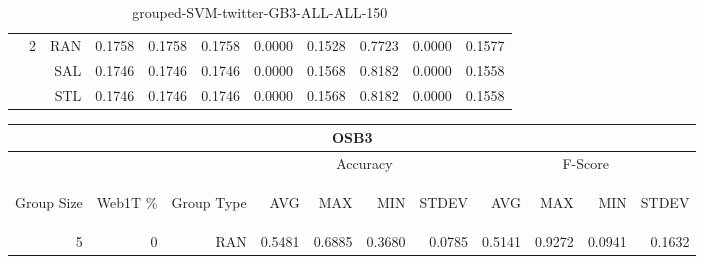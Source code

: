 \begin{center}
\begin{table}[htbp]
\begin{center}
\begin{tabular}{ | r | r | r | r | r | r | r | r | r | r | r |}
 & \multirow{3}{*}{2} & RAN & 0.1758 & 0.1758 & 0.1758 & 0.0000 & 0.1528 & 0.7723 & 0.0000 & 0.1577\\ \cline{3-11}
 &   & SAL & 0.1746 & 0.1746 & 0.1746 & 0.0000 & 0.1568 & 0.8182 & 0.0000 & 0.1558\\ \cline{3-11}
 &   & STL & 0.1746 & 0.1746 & 0.1746 & 0.0000 & 0.1568 & 0.8182 & 0.0000 & 0.1558\\ \cline{2-11}
\hline
\end{tabular}
\caption{grouped-SVM-twitter-GB3-ALL-ALL-150}
\end{center}
 \end{table}
\end{center}

\begin{center}
\begin{table}[htbp] 
 \begin{center}
\begin{tabular}{ | r | r | r | r | r | r | r | r | r | r | r |}
\hline
\multicolumn{11}{|c|}{OSB3}\\
\hline
 & & & \multicolumn{4}{|c|}{Accuracy} & \multicolumn{4}{|c|}{F-Score}\\ \cline{4-11}
\begin{sideways}Group Size\end{sideways} & \begin{sideways}Web1T \%\end{sideways} & \begin{sideways}Group Type\end{sideways} & \begin{sideways}AVG\end{sideways} & \begin{sideways}MAX\end{sideways} & \begin{sideways}MIN\end{sideways} & \begin{sideways}STDEV\end{sideways} & \begin{sideways}AVG\end{sideways} & \begin{sideways}MAX\end{sideways} & \begin{sideways}MIN\end{sideways} & \begin{sideways}STDEV\end{sideways}\\
\hline
\multirow{18}{*}{5}
 & \multirow{3}{*}{0} & RAN & 0.5481 & 0.6885 & 0.3680 & 0.0785 & 0.5141 & 0.9272 & 0.0941 & 0.1632\\ \cline{3-11}

\end{tabular}
\end{center}
\end{table}
\end{center}

